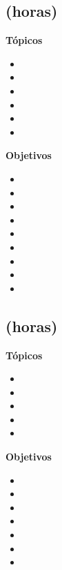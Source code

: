 \subsection{\OSCINCODef  (\OSCINCOHours horas)}\label{sec:BOK-OS5}

\textbf{Tópicos}
\begin{itemize}
	\item \OSCINCOTopicRevision
	\item \OSCINCOTopicRetardos
	\item \OSCINCOTopicPaginamiento
	\item \OSCINCOTopicPoliticas
	\item \OSCINCOTopicConjuntos
	\item \OSCINCOTopicCaching
\end{itemize}

\textbf{Objetivos}
\begin{itemize}
	\item \OSCINCOObjUNO
	\item \OSCINCOObjDOS
	\item \OSCINCOObjTRES
	\item \OSCINCOObjCUATRO
	\item \OSCINCOObjCINCO
	\item \OSCINCOObjSEIS
	\item \OSCINCOObjSIETE
	\item \OSCINCOObjOCHO
	\item \OSCINCOObjNUEVE
\end{itemize}

\subsection{\OSSEISDef  (\OSSEISHours horas)}\label{sec:BOK-OS6}

\textbf{Tópicos}
\begin{itemize}
	\item \OSSEISTopicCaracteristicas
	\item \OSSEISTopicDiferencias
	\item \OSSEISTopicEstrategias
	\item \OSSEISTopicAcceso
	\item \OSSEISTopicRecuperacion
\end{itemize}

\textbf{Objetivos}
\begin{itemize}
	\item \OSSEISObjUNO
	\item \OSSEISObjDOS
	\item \OSSEISObjTRES
	\item \OSSEISObjCUATRO
	\item \OSSEISObjCINCO
	\item \OSSEISObjSEIS
	\item \OSSEISObjSIETE
\end{itemize}


